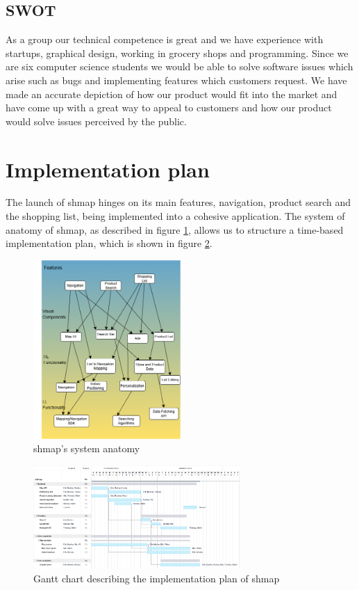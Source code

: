 \documentclass[titlepage]{article}
\def\companyName{shmap}
\begin{document}
\subsection{SWOT}

As a group our technical competence is great and we have experience with startups, graphical design, working in grocery shops and programming. Since we are six computer science students we would be able to solve software issues which arise such as bugs and implementing features which customers request. We have made an accurate depiction of how our product would fit into the market and have come up with a great way to appeal to customers and how our product would solve issues perceived by the public.

\section{Implementation plan}

The launch of shmap hinges on its main features, navigation, product search and the shopping list, being implemented into a cohesive application. The system of anatomy of \companyName, as described in figure \ref{fig:sysanat}, allows us to structure a time-based implementation plan, which is shown in figure \ref{fig:ganttchart}.

\begin{figure}[h]
    \centering
    \includegraphics[width=0.5\textwidth]{SystemAnatomy.png}
    \caption{\companyName's system anatomy}
    \label{fig:sysanat}
\end{figure}

\begin{figure}[h]
    \centering
    \includegraphics[width=0.7\textwidth]{implementation_plan.png}
    \caption{Gantt chart describing the implementation plan of \companyName}
    \label{fig:ganttchart}
\end{figure}
\end{document}
